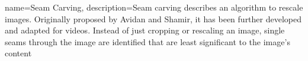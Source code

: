 

 {
   name=Seam Carving,
   description={Seam carving describes an algorithm to rescale images. Originally proposed by Avidan and Shamir, it has been further developed and adapted for videos. Instead of just cropping or rescaling an image, single seams through the image are identified that are least significant to the image's content}
}
